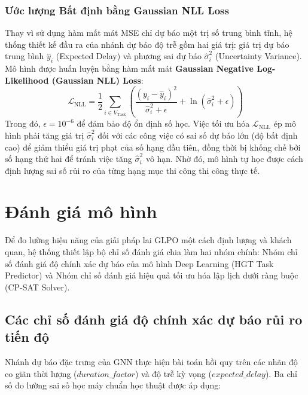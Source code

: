 \subsubsection{Ước lượng Bất định bằng Gaussian NLL Loss}
Thay vì sử dụng hàm mất mát MSE chỉ dự báo một trị số trung bình tĩnh, hệ thống thiết kế đầu ra của nhánh dự báo độ trễ gồm hai giá trị: giá trị dự báo trung bình $\hat{y}_i$ (Expected Delay) và phương sai dự báo $\hat{\sigma}_i^2$ (Uncertainty Variance). Mô hình được huấn luyện bằng hàm mất mát \textbf{Gaussian Negative Log-Likelihood (Gaussian NLL) Loss}:
$$\mathcal{L}_{\text{NLL}} = \frac{1}{2} \sum_{i \in V_{\text{Task}}} \left( \frac{(y_i - \hat{y}_i)^2}{\hat{\sigma}_i^2 + \epsilon} + \ln(\hat{\sigma}_i^2 + \epsilon) \right)$$
Trong đó, $\epsilon = 10^{-6}$ để đảm bảo độ ổn định số học. Việc tối ưu hóa $\mathcal{L}_{\text{NLL}}$ ép mô hình phải tăng giá trị $\hat{\sigma}_i^2$ đối với các công việc có sai số dự báo lớn (độ bất định cao) để giảm thiểu giá trị phạt của số hạng đầu tiên, đồng thời bị khống chế bởi số hạng thứ hai để tránh việc tăng $\hat{\sigma}_i^2$ vô hạn. Nhờ đó, mô hình tự học được cách định lượng sai số rủi ro của từng hạng mục thi công thi công thực tế.


\section{Đánh giá mô hình}
\label{sec:2.10_model_evaluation}

Để đo lường hiệu năng của giải pháp lai GLPO một cách định lượng và khách quan, hệ thống thiết lập bộ chỉ số đánh giá chia làm hai nhóm chính: Nhóm chỉ số đánh giá độ chính xác dự báo của mô hình Deep Learning (HGT Task Predictor) và Nhóm chỉ số đánh giá hiệu quả tối ưu hóa lập lịch dưới ràng buộc (CP-SAT Solver).

\subsection{Các chỉ số đánh giá độ chính xác dự báo rủi ro tiến độ}
Nhánh dự báo đặc trưng của GNN thực hiện bài toán hồi quy trên các nhãn độ co giãn thời lượng ($duration\_factor$) và độ trễ kỳ vọng ($expected\_delay$). Ba chỉ số đo lường sai số học máy chuẩn học thuật được áp dụng:

